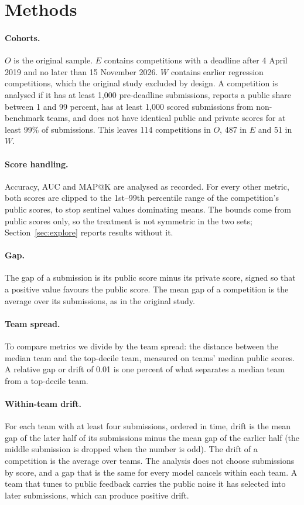 \documentclass[10pt]{article}
\begin{document}
\section{Methods}
\label{sec:methods}

\paragraph{Cohorts.} $O$ is the original sample. $E$ contains competitions with a deadline after 4 April 2019 and no later than 15 November 2026. $W$ contains earlier regression competitions, which the original study excluded by design. A competition is analysed if it has at least 1,000 pre-deadline submissions, reports a public share between 1 and 99 percent, has at least 1,000 scored submissions from non-benchmark teams, and does not have identical public and private scores for at least 99\% of submissions. This leaves 114 competitions in $O$, 487 in $E$ and 51 in $W$.

\paragraph{Score handling.} Accuracy, AUC and MAP@K are analysed as recorded. For every other metric, both scores are clipped to the 1st--99th percentile range of the competition's public scores, to stop sentinel values dominating means. The bounds come from public scores only, so the treatment is not symmetric in the two sets; Section~\ref{sec:explore} reports results without it.

\paragraph{Gap.} The gap of a submission is its public score minus its private score, signed so that a positive value favours the public score. The mean gap of a competition is the average over its submissions, as in the original study.

\paragraph{Team spread.} To compare metrics we divide by the team spread: the distance between the median team and the top-decile team, measured on teams' median public scores. A relative gap or drift of 0.01 is one percent of what separates a median team from a top-decile team.

\paragraph{Within-team drift.} For each team with at least four submissions, ordered in time, drift is the mean gap of the later half of its submissions minus the mean gap of the earlier half (the middle submission is dropped when the number is odd). The drift of a competition is the average over teams. The analysis does not choose submissions by score, and a gap that is the same for every model cancels within each team. A team that tunes to public feedback carries the public noise it has selected into later submissions, which can produce positive drift.
\end{document}
